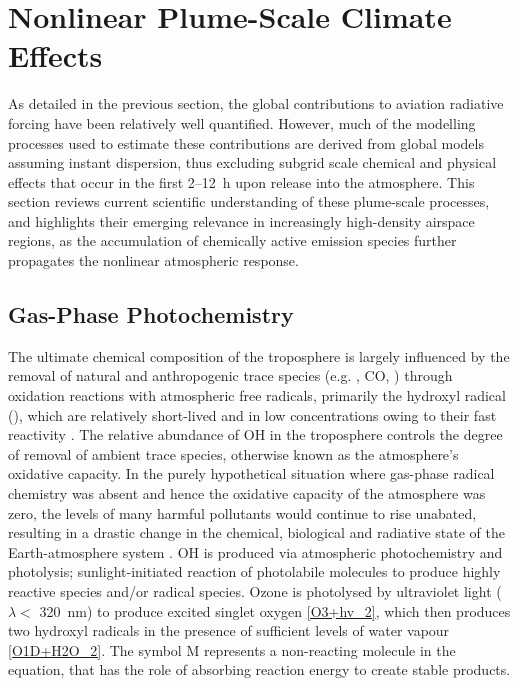 \section{Nonlinear Plume-Scale Climate Effects}
\label{2.6}
As detailed in the previous section, the global contributions to aviation radiative forcing have been relatively well quantified. However, much of the modelling processes used to estimate these contributions are derived from global models assuming instant dispersion, thus excluding subgrid scale chemical and physical effects that occur in the first 2--12~h upon release into the atmosphere. This section reviews current scientific understanding of these plume-scale processes, and highlights their emerging relevance in increasingly high-density airspace regions, as the accumulation of chemically active emission species further propagates the nonlinear atmospheric response.

\subsection{Gas-Phase Photochemistry}
\label{Gas-phase_photochem}
The ultimate chemical composition of the troposphere is largely influenced by the removal of natural and anthropogenic trace species (e.g. , CO, ) through oxidation reactions with atmospheric free radicals, primarily the hydroxyl radical (), which are relatively short-lived and in low concentrations owing to their fast reactivity \cite{Stone2012, Monks2005}. The relative abundance of OH in the troposphere controls the degree of removal of ambient trace species, otherwise known as the atmosphere's oxidative capacity. In the purely hypothetical situation where gas-phase radical chemistry was absent and hence the oxidative capacity of the atmosphere was zero, the levels of many harmful pollutants would continue to rise unabated, resulting in a drastic change in the chemical, biological and radiative state of the Earth-atmosphere system \cite{Prinn2003}. OH is produced via atmospheric photochemistry and photolysis; sunlight-initiated reaction of photolabile molecules to produce highly reactive species and/or radical species. Ozone is photolysed by ultraviolet light ($\lambda <$ 320~nm) to produce excited singlet oxygen  \eqref{O3+hv_2}, which then produces two hydroxyl radicals in the presence of sufficient levels of water vapour \eqref{O1D+H2O_2}. The symbol M represents a non-reacting molecule in the equation, that has the role of absorbing reaction energy to create stable products.

